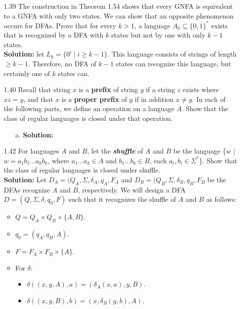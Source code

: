 \begin{enumerate}
\item[1.39]The construction in Theorem 1.54 shows that every GNFA is equivalent to a GNFA with only two states. We can show that an opposite phenomenon occurs for DFAs. Prove that for every $k > 1$, a language $A_k \subseteq \{0,1\}^*$ exists that is recognized by a DFA with $k$ states but not by one with only $k-1$ states.
\\
\textbf{Solution:} let $L_k = \{0^i\;\vert\;i \ge k-1\}$. This language consists of strings of length $\ge k-1$. Therefore, no DFA of $k-1$ states can recognize this language, but certainly one of $k$ states can.

\item[1.40]Recall that string $x$ is a \textbf{prefix} of string $y$ if a string $z$ exists where $xz = y$, and that $x$ is a \textbf{proper prefix} of $y$ if in addition $x \ne y$. In each of the following parts, we define an operation on a language $A$. Show that the class of regular languages is closed under that operation.
\begin{enumerate}
\item[a.]\textbf{Solution:} \alreadyanswered
\end{enumerate}

\item[1.42]For languages $A$ and $B$, let the \emph{\textbf{shuffle}} of $A$ and $B$ be the language \{$w$ $|$ $w=a_1b_1...a_kb_k$, where $a_1...a_k \in A$ and $b_1...b_k \in B$, each $a_i,b_i \in \Sigma^*$\}. Show that the class of regular languages is closed under shuffle.
\\
\textbf{Solution:} Let $D_A = (Q_A, \Sigma, \delta_A, q_A, F_A$ and $D_B = (Q_B, \Sigma, \delta_B, q_B, F_B$ be the DFAs recognize $A$ and $B$, respectively. We will design a DFA $D = (Q, \Sigma, \delta, q_0, F)$ such that it recognizes the shuffle of $A$ and $B$ as follows:
\begin{itemize}
\item $Q = Q_A \times Q_B \times \{A, B\}$.
\item $q_0 = (q_A, q_B, A)$.
\item $F = F_A \times F_B \times \{A\}$.
\item For $\delta$:
\begin{itemize}
\item $\delta((x, y, A), a) = (\delta_A(x, a), y, B)$.
\item $\delta((x, y, B), b) = (x, \delta_B(y, b), A)$.
\end{itemize}
\end{itemize}


\end{enumerate}
